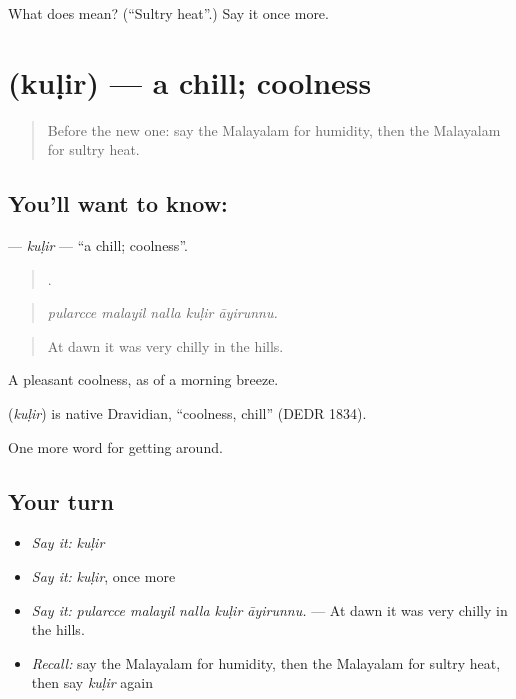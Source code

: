 \begin{tcolorbox}[breakable,colback=teal!4,colframe=teal!35!black,title={Before you move on}]
What does  mean? (\textquotedblleft{}Sultry heat\textquotedblright{}.) Say it once more.
\end{tcolorbox}
\section[\texorpdfstring{\ml{കുളിർ} (kuḷir)}{കുളിർ (kuḷir)}]{ (kuḷir) — a chill; coolness}

\label{lesson:ML-C509-kulir}



\begin{quote}
Before the new one: say the Malayalam for humidity, then the Malayalam for sultry heat.
\end{quote}

\subsection*{You'll want to know: }
\textbf{} — \emph{kuḷir} — \textquotedblleft{}a chill; coolness\textquotedblright{}.

\begin{quote}
    .
\end{quote}

\begin{quote}
\emph{pularcce malayil nalla kuḷir āyirunnu.}
\end{quote}

\begin{quote}
At dawn it was very chilly in the hills.
\end{quote}

A pleasant coolness, as of a morning breeze.

\begin{cousinweb}
\textbf{} (\emph{kuḷir}) is native Dravidian, \textquotedblleft{}coolness, chill\textquotedblright{} (DEDR 1834).
\end{cousinweb}

\begin{grammarlens}[title={What you've built}]
One more word for getting around.
\end{grammarlens}

\subsection*{Your turn}
\begin{itemize}
\raggedright
  \item \emph{Say it:} \emph{kuḷir}
  \item \emph{Say it:} \emph{kuḷir}, once more
  \item \emph{Say it:} \emph{pularcce malayil nalla kuḷir āyirunnu.} — At dawn it was very chilly in the hills.
  \item \emph{Recall:} say the Malayalam for humidity, then the Malayalam for sultry heat, then say \emph{kuḷir} again
\end{itemize}

